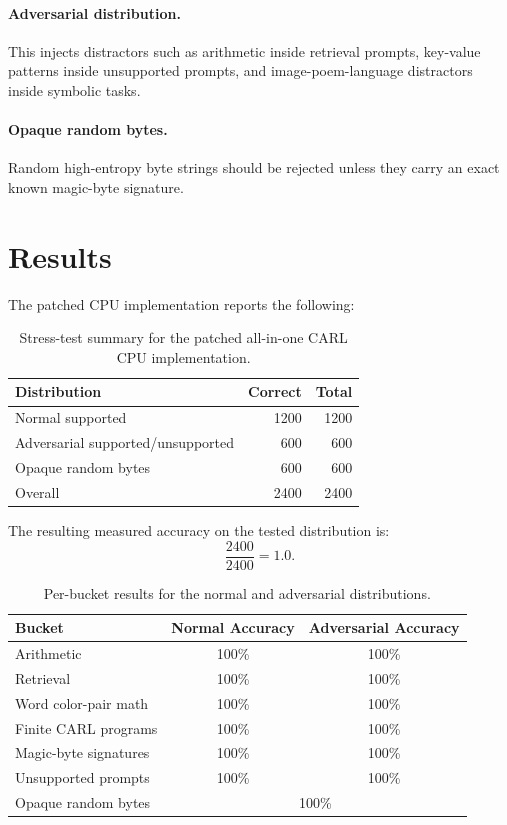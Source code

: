 \documentclass[10pt]{article}
\newcommand{\CARL}{\textsc{CARL}}
\begin{document}
\paragraph{Adversarial distribution.}
This injects distractors such as arithmetic inside retrieval prompts, key-value patterns inside unsupported prompts, and image-poem-language distractors inside symbolic tasks.

\paragraph{Opaque random bytes.}
Random high-entropy byte strings should be rejected unless they carry an exact known magic-byte signature.

\section{Results}

The patched CPU implementation reports the following:

\begin{table}[h]
\centering
\caption{Stress-test summary for the patched all-in-one \CARL{} CPU implementation.}
\begin{tabular}{lrr}
\toprule
Distribution & Correct & Total \\
\midrule
Normal supported & 1200 & 1200 \\
Adversarial supported/unsupported & 600 & 600 \\
Opaque random bytes & 600 & 600 \\
\midrule
Overall & 2400 & 2400 \\
\bottomrule
\end{tabular}
\end{table}

The resulting measured accuracy on the tested distribution is:
\[
\frac{2400}{2400} = 1.0.
\]

\begin{table}[h]
\centering
\caption{Per-bucket results for the normal and adversarial distributions.}
\begin{tabular}{lcc}
\toprule
Bucket & Normal Accuracy & Adversarial Accuracy \\
\midrule
Arithmetic & 100\% & 100\% \\
Retrieval & 100\% & 100\% \\
Word color-pair math & 100\% & 100\% \\
Finite \CARL{} programs & 100\% & 100\% \\
Magic-byte signatures & 100\% & 100\% \\
Unsupported prompts & 100\% & 100\% \\
Opaque random bytes & \multicolumn{2}{c}{100\%} \\
\bottomrule
\end{tabular}
\end{table}
\end{document}
